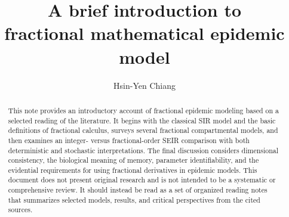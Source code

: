\documentclass[11pt,nosumlimits,twoside]{amsart}
\theoremstyle{mytheorem}
\theoremstyle{myremark}
\theoremstyle{mydefinition}
\theoremstyle{myzusatz}
\begin{document}
\title{A brief introduction to\\fractional mathematical epidemic model}
\author{Hsin-Yen Chiang}

\begin{abstract}
This note provides an introductory account of fractional epidemic modeling based on a selected reading of the literature.
It begins with the classical SIR model and the basic definitions of fractional calculus, surveys several fractional compartmental models, and then examines an integer- versus fractional-order SEIR comparison with both deterministic and stochastic interpretations.
The final discussion considers dimensional consistency, the biological meaning of memory, parameter identifiability, and the evidential requirements for using fractional derivatives in epidemic models.
This document does not present original research and is not intended to be a systematic or comprehensive review.
It should instead be read as a set of organized reading notes that summarizes selected models, results, and critical perspectives from the cited sources.
\end{abstract}

\maketitle

\tableofcontents

\clearpage













\clearpage
\printbibliography
\end{document}
